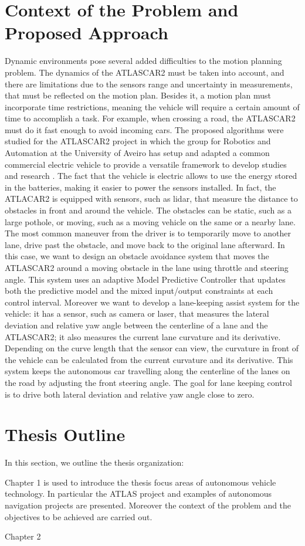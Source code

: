 \section{Context of the Problem and Proposed Approach}\label{sec:context}
Dynamic environments pose several added difficulties to the motion planning problem. The dynamics of the ATLASCAR2 must be taken into account, and there are limitations due to the sensors range and uncertainty in measurements, that must be reflected on the motion plan. Besides it, a motion plan must incorporate time restrictions, meaning the vehicle will require a certain amount of time to accomplish a task. For example, when crossing a road, the ATLASCAR2 must do it fast enough to avoid incoming cars. The proposed algorithms were studied for the ATLASCAR2 project in which the group for Robotics and Automation at the University of Aveiro has setup and adapted a common commercial electric vehicle to provide a versatile  framework  to  develop  studies  and  research \cite{vsantos2010} \cite{vsantos2019}. The fact that the vehicle is electric allows to use the energy stored in the batteries, making it easier to power the sensors installed. In fact, the ATLACAR2 is equipped with sensors, such as lidar, that measure the distance to obstacles in front and around the vehicle. The obstacles can be static, such as a large pothole, or moving, such as a moving vehicle on the same or a nearby lane. The most common maneuver from the driver is to temporarily move to another lane, drive past the obstacle, and move back to the original lane afterward. In this case, we want to design an obstacle avoidance system that moves the ATLASCAR2 around a moving obstacle in the lane using throttle and steering angle. This system uses an adaptive Model Predictive Controller that updates both the predictive model and the mixed input/output constraints at each control interval. Moreover we want to develop a lane-keeping assist system for the vehicle: it has a sensor, such as camera or laser, that measures the lateral deviation and relative yaw angle between the centerline of a lane and the ATLASCAR2; it also measures the current lane curvature and its derivative. Depending on the curve length that the sensor can view, the curvature in front of the vehicle can be calculated from the current curvature and its derivative. This system keeps the autonomous car travelling along the centerline of the lanes on the road by adjusting the front steering angle. The goal for lane keeping control is to drive both lateral deviation and relative yaw angle close to zero.

\section{Thesis Outline}\label{sec:outline}

In this section, we outline the thesis organization: 

Chapter 1 is used to introduce the thesis focus areas of autonomous vehicle technology. In particular the ATLAS project and examples of autonomous navigation projects are presented. Moreover the context of the problem and the objectives to be achieved are carried out.

Chapter 2 



